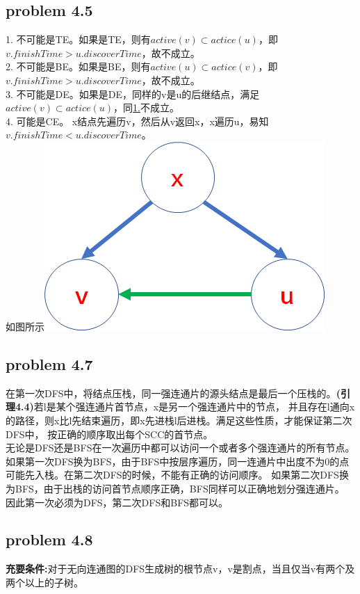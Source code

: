 \documentclass[11pt,a4paper,oneside,oldfontcommands]{ctexart}
\begin{document}
{\subsection*{problem 4.5}}
\noindent \hypertarget{1.}{1. }不可能是TE。如果是TE，则有$active(v)\subset actice(u)$，即$v.finishTime>u.discoverTime$，故不成立。\\
2. 不可能是BE。如果是BE，则有$active(u)\subset actice(v)$，即$v.finishTime>u.discoverTime$，故不成立。\\
3. 不可能是DE。如果是DE，同样的v是u的后继结点，满足$active(v)\subset actice(u)$，同\hyperref[1.]{1.}不成立。\\
4. 可能是CE。
x结点先遍历v，然后从v返回x，x遍历u，易知$v.finishTime<u.discoverTime$。\\
如图所示\includegraphics{CEORDER.png}\\
\newpage
{\subsection*{problem 4.7}}
在第一次DFS中，将结点压栈，同一强连通片的源头结点是最后一个压栈的。\textbf{(引理4.4)}若l是某个强连通片首节点，x是另一个强连通片中的节点，
并且存在l通向x的路径，则x比l先结束遍历，即x先进栈l后进栈。满足这些性质，才能保证第二次DFS中，
按正确的顺序取出每个SCC的首节点。\\
\hspace*{20pt}无论是DFS还是BFS在一次遍历中都可以访问一个或者多个强连通片的所有节点。\\
\hspace*{20pt}如果第一次DFS换为BFS，由于BFS中按层序遍历，同一连通片中出度不为0的点可能先入栈。在第二次DFS的时候，不能有正确的访问顺序。
\hspace*{20pt}如果第二次DFS换为BFS，由于出栈的访问首节点顺序正确，BFS同样可以正确地划分强连通片。\\
\hspace*{20pt}因此第一次必须为DFS，第二次DFS和BFS都可以。
{\subsection*{problem 4.8}}
\noindent\textbf{充要条件:}对于无向连通图的DFS生成树的根节点v，v是割点，当且仅当v有两个及两个以上的子树。
\end{document}
